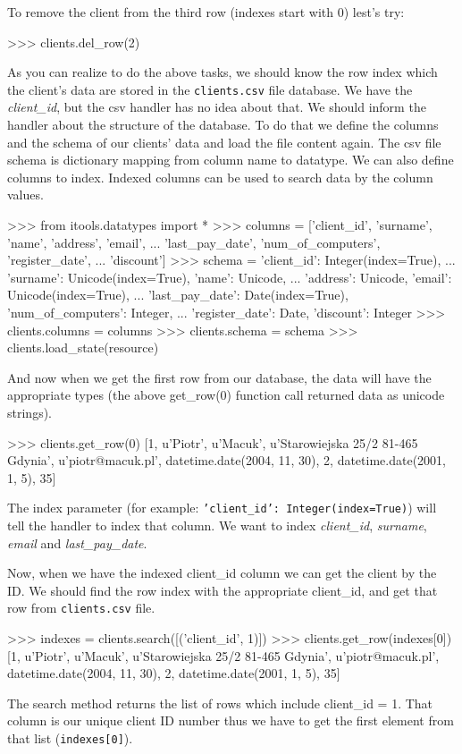 \documentclass[a4paper]{book}
\begin{document}
To remove the client from the third row (indexes start with 0) lest's try:
\begin{code}
    >>> clients.del_row(2)
\end{code}
As you can realize to do the above tasks, we should know the row index 
which the client's data are stored in the {\tt clients.csv} file database. 
We have the {\em client\_id}, but the csv handler has no idea about that. 
We should inform the handler about the structure of the database. To do that 
we define the columns and the schema of our clients' data and load the file 
content again. The csv file schema is dictionary mapping from column name to
datatype. We can also define columns to index. Indexed columns can be used
to search data by the column values.
\begin{code}
    >>> from itools.datatypes import *
    >>> columns = ['client_id', 'surname', 'name', 'address', 'email',
    ... 'last_pay_date', 'num_of_computers', 'register_date',
    ... 'discount']
    >>> schema = {'client_id': Integer(index=True), 
    ... 'surname': Unicode(index=True), 'name': Unicode, 
    ... 'address': Unicode, 'email': Unicode(index=True),
    ... 'last_pay_date': Date(index=True), 'num_of_computers': Integer,
    ... 'register_date': Date, 'discount': Integer}
    >>> clients.columns = columns
    >>> clients.schema = schema
    >>> clients.load_state(resource)
\end{code}

And now when we get the first row from our database, the data will have the 
appropriate types (the above get\_row(0) function call returned data as unicode 
strings).
\begin{code}
    >>> clients.get_row(0)
    [1, u'Piotr', u'Macuk', u'Starowiejska 25/2 81-465 Gdynia',
    u'piotr@macuk.pl', datetime.date(2004, 11, 30), 2, 
    datetime.date(2001, 1, 5), 35] 
\end{code}

The index parameter (for example: {\tt 'client\_id': Integer(index=True)})
will  tell the handler to index that column. We want to index {\em client\_id},
{\em surname}, {\em email} and {\em last\_pay\_date}.

Now, when we have the indexed client\_id column we can get the client
by the ID. We should find the row index with the appropriate client\_id,
and get that row from {\tt clients.csv} file.
\begin{code}
    >>> indexes = clients.search([('client_id', 1)])
    >>> clients.get_row(indexes[0])
    [1, u'Piotr', u'Macuk', u'Starowiejska 25/2 81-465 Gdynia', 
    u'piotr@macuk.pl', datetime.date(2004, 11, 30), 2, 
    datetime.date(2001, 1, 5), 35]
\end{code}
The search method returns the list of rows which include client\_id = 1.
That column is our unique client ID number thus we have to get the first
element from that list ({\tt indexes[0]}).
\end{document}
